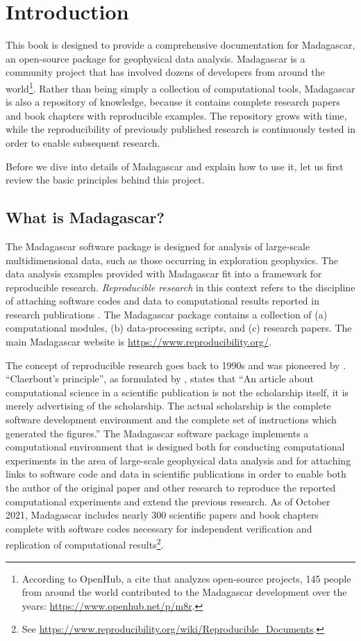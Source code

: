 \chapter{Introduction}

This book is designed to provide a comprehensive documentation for
Madagascar, an open-source package for geophysical data
analysis. Madagascar is a community project that has involved dozens
of developers from around the world\footnote{According to OpenHub, a
  cite that analyzes open-source projects, 145 people from around the
  world contributed to the Madagascar development over the years:
  \url{https://www.openhub.net/p/m8r}.}. Rather than being simply a
collection of computational tools, Madagascar is also a repository of
knowledge, because it contains complete research papers and book
chapters with reproducible examples. The repository grows with time,
while the reproducibility of previously published research is
continuously tested in order to enable subsequent research.

Before we dive into details of Madagascar and explain how to use it,
let us first review the basic principles behind this project.

\section{What is Madagascar?}

The Madagascar software package is designed for analysis of
large-scale multidimensional data, such as those occurring in
exploration geophysics. The data analysis examples provided with
Madagascar fit into a framework for reproducible
research. \emph{Reproducible research} in this context refers to the
discipline of attaching software codes and data to computational
results reported in research publications \cite[]{fomel2008guest}. The
Madagascar package contains a collection of (a) computational modules,
(b) data-processing scripts, and (c) research papers. The main Madagascar
website is \url{https://www.reproducibility.org/}.

The concept of reproducible research goes back to 1990s and was
pioneered by \cite{Claerbout.sep.67.139}. ``Claerbout's principle'',
as formulated by \cite{buckheit1995wavelab}, states that ``An article
about computational science in a scientific publication is not the
scholarship itself, it is merely advertising of the scholarship. The
actual scholarship is the complete software development environment
and the complete set of instructions which generated the figures.''
The Madagascar software package implements a computational environment
that is designed both for conducting computational experiments in the
area of large-scale geophysical data analysis and for attaching links
to software code and data in scientific publications in order to
enable both the author of the original paper and other research to
reproduce the reported computational experiments and extend the
previous research. As of October 2021, Madagascar includes nearly 300
scientific papers and book chapters complete with software codes
necessary for independent verification and replication of
computational results\footnote{See
  \url{https://www.reproducibility.org/wiki/Reproducible_Documents}.}.

